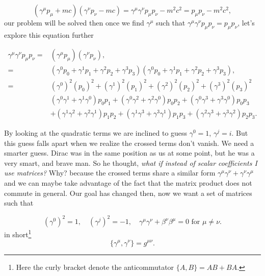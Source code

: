 \begin{equation*}
  (\gamma^\mu p_\mu + mc)(\gamma^\nu p_\nu -mc) = \gamma^\mu\gamma^\nu p_\mu p_\nu - m^2c^2 = p_\mu p_\nu - m^2c^2,
\end{equation*}
our problem will be solved then once we find $\gamma^\mu$ such that $\gamma^\mu\gamma^\nu p_\mu p_\nu = p_\mu p_\nu$, let's explore this equation further

\begin{equation*}
  \begin{aligned}
    \gamma^\mu\gamma^\nu p_\mu p_\nu = &(\gamma^\mu p_\mu)(\gamma^\nu p_\nu),\\
    =&(\gamma^0 p_0 + \gamma^1 p_1 + \gamma^2 p_2 + \gamma^3 p_3)(\gamma^0 p_0 + \gamma^1 p_1 + \gamma^2 p_2 + \gamma^3 p_3),\\
    = &(\gamma^0)^2 (p_0)^2 + (\gamma^1)^2 (p_1)^2 + (\gamma^2)^2 (p_2)^2 + (\gamma^3)^2 (p_3)^2 \\
    & (\gamma^0\gamma^1 + \gamma^1\gamma^0)p_0p_1
    +(\gamma^0\gamma^2 + \gamma^2\gamma^0)p_0p_2
    +(\gamma^0\gamma^3 + \gamma^3\gamma^0)p_0p_3\\
    &+(\gamma^1\gamma^2 + \gamma^2\gamma^1)p_1p_2
    +(\gamma^1\gamma^3 + \gamma^3\gamma^1)p_1p_3
    +(\gamma^2\gamma^3 + \gamma^3\gamma^2)p_2p_3.
  \end{aligned}
\end{equation*}

By looking at the quadratic terms we are inclined to guess $\gamma^0 = 1$, $\gamma^j = i$. But this guess falls apart when we realize the crossed terms don't vanish. We need a smarter guess. Dirac was in the same position as us at some point, but he was a very smart, and brave man. So he thought, \textit{what if instead of scalar coefficients I use matrices?} Why? because the crossed terms share a similar form $\gamma^\mu\gamma^\nu + \gamma^\nu\gamma^\mu$ and we can maybe take advantage of the fact that the matrix product does not commute in general. Our goal has changed then, now we want a set of matrices such that

\begin{equation*}
  (\gamma^0)^2= 1, \quad (\gamma^j)^2 = -1, \quad \gamma^\mu \gamma^\nu + \beta^\nu \beta^\mu = 0 \text{ for } \mu \neq \nu.
\end{equation*}
in short\footnote{Here the curly bracket denote the anticommutator $\{A,B\} = AB + BA$.}
\begin{equation}
  \{\gamma^\mu, \gamma^\nu\} = g^{\mu \nu}.
\end{equation}

